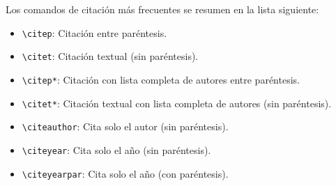 \newpage
Los comandos de citación más frecuentes se resumen en la lista siguiente:

\begin{itemize}
    \item \verb+\citep+: Citación entre paréntesis.
    \item \verb+\citet+: Citación textual (sin paréntesis).
    \item \verb+\citep*+: Citación con lista completa de autores entre paréntesis.
    \item \verb+\citet*+: Citación textual con lista completa de autores (sin paréntesis).
    \item \verb+\citeauthor+: Cita solo el autor (sin paréntesis).
    \item \verb+\citeyear+: Cita solo el año (sin paréntesis).
    \item \verb+\citeyearpar+: Cita solo el año (con paréntesis).
\end{itemize}
